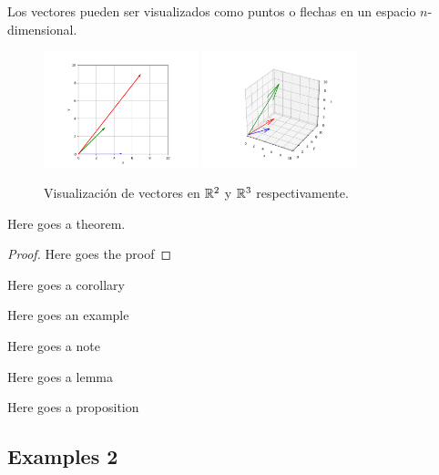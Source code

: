 Los vectores pueden ser visualizados como puntos o flechas en un espacio $n$-dimensional.

\begin{figure}[htbp]
    \centering
    \includegraphics[width=0.4\textwidth]{Images/1/vectors.png}
    \hspace{2cm} 
    \includegraphics[width=0.4\textwidth]{Images/1/vectors_3d.png}
    \caption{Visualización de vectores en $\mathbb{R}^2$ y $\mathbb{R}^3$ respectivamente.}
    \label{fig:imagenes}
\end{figure}

\lipsum[1]

\begin{theorem}
    Here goes a theorem.
    \lipsum[1]
\end{theorem}

\begin{proof}
        Here goes the proof

    \lipsum[2]
\end{proof}


\begin{corollary}
    Here goes a corollary
\end{corollary}

\begin{eg}
    Here goes an example
\end{eg}

\begin{note}
    Here goes a note 

    \lipsum[2]
\end{note}


\begin{lemma}
    Here goes a lemma
\end{lemma}

\begin{prop}
    Here goes a proposition
\end{prop}

\subsection{Examples 2}
